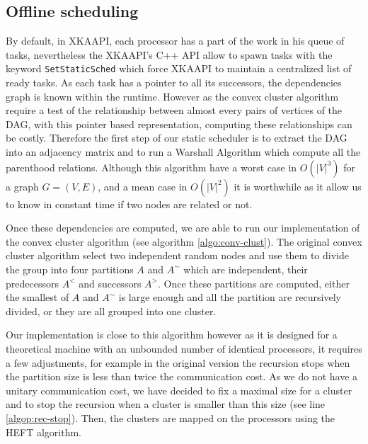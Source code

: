\documentclass[10pt, conference, compsocconf,pdftex,dvipsnames]{IEEEtran}
\begin{document}
\subsection{Offline scheduling}
\label{sec:impl-off}
By default, in XKAAPI, each processor has a part of the work in his queue of
tasks, nevertheless the XKAAPI's C++ API allow to spawn tasks with the keyword
\texttt{SetStaticSched} which force XKAAPI to maintain a centralized list of
ready tasks. As each task has a pointer to all its successors, the
dependencies graph is known within the runtime. However as the convex cluster
algorithm require a test of the relationship between almost every pairs of
vertices of the DAG,  with this pointer based representation, computing these
relationships can be costly. Therefore the first step of our static scheduler
is to extract the DAG into an adjacency matrix and to run a Warshall Algorithm
which compute all the parenthood relations. Although this algorithm have a
worst case in $O(|V|^3)$ for a graph $G=(V,E)$, and a mean case in $O(|V|^2)$
it is worthwhile as it allow us to know in constant time if two nodes are
related or not.

Once these dependencies are computed, we are able to run our implementation of
the convex cluster algorithm (see algorithm \ref{algo:conv-clust}). The
original convex cluster algorithm select two independent random nodes and use
them to divide the group into four partitions $A$ and $A^{\sim}$ which are
independent, their predecessors $A^<$ and successors $A^>$. Once these
partitions are computed, either the smallest of $A$ and $A^{\sim}$ is large
enough and all the partition are recursively divided, or they are all grouped
into one cluster. 

Our implementation is close to this algorithm however as it is designed for a
theoretical machine with an unbounded number of identical processors, it
requires a few adjustments, for example in the original version the recursion
stops when the partition size is less than twice the communication cost. As we
do not have a unitary communication cost, we have decided to fix a maximal
size for a cluster and to stop the recursion when a cluster is smaller than
this size (see line \ref{algop:rec-stop}). Then, the clusters are mapped on the
processors using the HEFT algorithm. 
\end{document}
